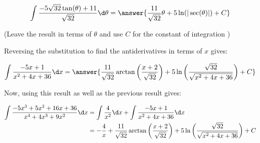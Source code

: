 \documentclass{ximera}
\begin{document}
\begin{exercise}
\begin{exercise}
\begin{exercise}
\begin{exercise}
\begin{exercise}
\begin{exercise}
\begin{exercise}
\begin{exercise}
\[
\int   \frac{-5\sqrt{32}\tan(\theta)+11}{\sqrt{32}}  \d \theta = \answer{\frac{11}{\sqrt{32}}\theta +5\ln(|\sec(\theta)|)+C}
\]

(Leave the result in terms of $\theta$ and use $C$ for the constant of integration )

\begin{exercise}

Reversing the substitution to find the antiderivatives in terms of $x$ gives:

\[\int \frac{-5x+1}{x^{2}+4x+36} \d x =\answer{\frac{11}{\sqrt{32}}\arctan\left(\frac{x+2}{\sqrt{32}}\right)
+ 5\ln\left(\frac{\sqrt{32}}{\sqrt{x^{2}+4x+36}}\right) + C}
\]

\begin{exercise}

Now, using this result as well as the previous result gives:

\begin{align*}
\int \frac{-5x^{3}+5x^{2}+16x+36}{x^{4}+4x^{3}+9x^{2}} \d x &= \int \frac{4}{x^{2}} \d x + \int \frac{-5x+1}{x^{2}+4x+36} \d x \\
&=-\frac{4}{x}+\frac{11}{\sqrt{32}}\arctan\left(\frac{x+2}{\sqrt{32}}\right) + 5\ln\left(\frac{\sqrt{32}}{\sqrt{x^{2}+4x+36}}\right) + C
\end{align*}

 

\end{exercise}
\end{exercise}
\end{exercise}
\end{exercise}
\end{exercise} 
\end{exercise}
\end{exercise}
\end{exercise}
\end{exercise}
\end{exercise}
\end{document}
